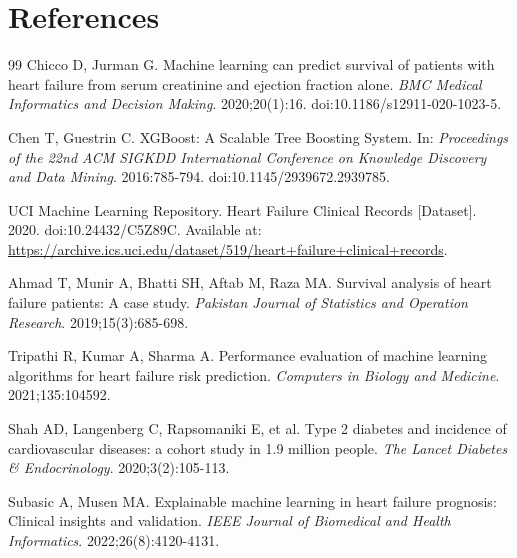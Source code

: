 \documentclass[12pt, a4paper]{article}
\begin{document}
\section{References}
\renewcommand{\refname}{}
\renewcommand{\bibname}{}
\begin{thebibliography}{99}
Chicco D, Jurman G. Machine learning can predict survival of patients with heart failure from serum creatinine and ejection fraction alone. \textit{BMC Medical Informatics and Decision Making}. 2020;20(1):16. doi:10.1186/s12911-020-1023-5.

Chen T, Guestrin C. XGBoost: A Scalable Tree Boosting System. In: \textit{Proceedings of the 22nd ACM SIGKDD International Conference on Knowledge Discovery and Data Mining}. 2016:785-794. doi:10.1145/2939672.2939785.

UCI Machine Learning Repository. Heart Failure Clinical Records [Dataset]. 2020. doi:10.24432/C5Z89C. Available at: \url{https://archive.ics.uci.edu/dataset/519/heart+failure+clinical+records}.

Ahmad T, Munir A, Bhatti SH, Aftab M, Raza MA. Survival analysis of heart failure patients: A case study. \textit{Pakistan Journal of Statistics and Operation Research}. 2019;15(3):685-698.

Tripathi R, Kumar A, Sharma A. Performance evaluation of machine learning algorithms for heart failure risk prediction. \textit{Computers in Biology and Medicine}. 2021;135:104592.

Shah AD, Langenberg C, Rapsomaniki E, et al. Type 2 diabetes and incidence of cardiovascular diseases: a cohort study in 1.9 million people. \textit{The Lancet Diabetes \& Endocrinology}. 2020;3(2):105-113.

Subasic A, Musen MA. Explainable machine learning in heart failure prognosis: Clinical insights and validation. \textit{IEEE Journal of Biomedical and Health Informatics}. 2022;26(8):4120-4131.
\end{thebibliography}
\end{document}
